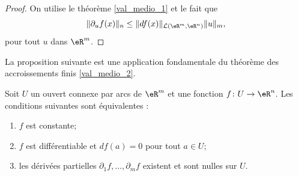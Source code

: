 \begin{proof}
 On utilise le théorème \ref{val_medio_1} et le fait que 
\[
\|\partial_u f(x)\|_n\leq \|df(x)\|_{\mathcal{L}(\eR^m,\eR^n)}\|u\|_m,
\]
pour tout $u$ dans $\eR^m$.
\end{proof}

La proposition suivante est une application fondamentale du théorème des accroissements finis \ref{val_medio_2}.
\begin{proposition}		\label{PropAnnulationEtConstance}
	Soit $U$ un ouvert connexe par arcs de $\eR^m$ et une fonction $f\colon U\to \eR^n$. Les conditions suivantes sont équivalentes :
	\begin{enumerate}
		\item\label{ItemPropCstDiffZeroi}
			$f$ est constante;
		\item\label{ItemPropCstDiffZeroii}
			$f$ est différentiable et $df(a)=0$ pour tout $a\in U$;
		\item\label{ItemPropCstDiffZeroiii}
			les dérivées partielles $\partial_1f,\ldots,\partial_mf$ existent et sont nulles sur $U$.
	\end{enumerate}
\end{proposition}

